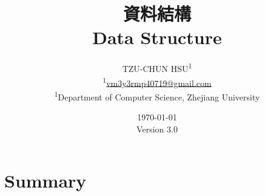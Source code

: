 \documentclass[12pt]{article}
\newcommand{\ver}{\textmd{Version} 3.0} %
\begin{document}
\title{\Huge{\textbf{資料結構}} \\
	\LARGE{\textbf{Data Structure}}
}
\newcommand*{\affaddr}[1]{#1}
\newcommand*{\affmark}[1][*]{\textsuperscript{#1}}
\author{
	TZU-CHUN HSU\affmark[1] \\
	\affmark[1]\href{mailto:vm3y3rmp40719@gmail.com}{vm3y3rmp40719@gmail.com} \\
	\affaddr{\affmark[1]Department of Computer Science, Zhejiang University
	}
}

\date{\mbox{}\vfill\today\\ \ver}

\maketitle
\pagebreak



\begingroup
\section{Summary}
\begin{enumerate}
\let\clearpage\relax








\end{enumerate}
\endgroup

\end{document}
